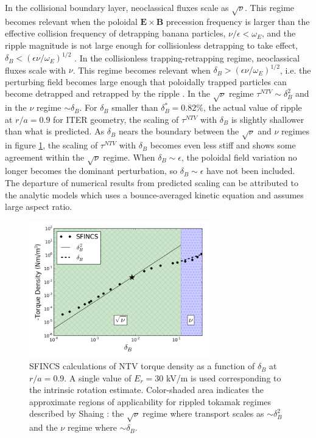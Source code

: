 \documentclass{article}
\numberwithin{figure}{section}
\numberwithin{equation}{section}
\begin{document}
In the collisional boundary layer, neoclassical fluxes scale as $\sqrt{\nu}$. This regime becomes relevant when the poloidal $\bm{E} \times \bm{B}$ precession frequency is larger than the effective collision frequency of detrapping banana particles, $\nu/\epsilon < \omega_E$, and the ripple magnitude is not large enough for collisionless detrapping to take effect, $\delta_B < \left(  \epsilon \nu/\omega_E \right)^{1/2}$ \cite{Shaing2008}. 
In the collisionless trapping-retrapping regime, neoclassical fluxes scale with $\nu$. This regime becomes relevant when $\delta_B > \left(  \epsilon \nu/\omega_E \right)^{1/2}$, i.e. the perturbing field becomes large enough that poloidally trapped particles can become detrapped and retrapped by the ripple \cite{Shaing2010}. In the $\sqrt{\nu}$ regime $\tau^{NTV} \sim \delta_B^2$ and in the $\nu$ regime $\sim \delta_B$. For $\delta_B$ smaller than $\delta_B^* = 0.82\%$, the actual value of ripple at $r/a=0.9$ for ITER geometry, the scaling of $\tau^{NTV}$ with $\delta_B$ is slightly shallower than what is predicted. 
As $\delta_B$ nears the boundary between the $\sqrt{\nu}$ and $\nu$ regimes in figure \ref{fig:scalescan}, the scaling of $\tau^{NTV}$ with $\delta_B$ becomes even less stiff and shows some agreement within the $\sqrt{\nu}$ regime. When $\delta_B \sim \epsilon$, the poloidal field variation no longer becomes the dominant perturbation, so $\delta_B \sim \epsilon$ have not been included. The departure of numerical results from predicted scaling can be attributed to the analytic models which uses a bounce-averaged kinetic equation and assumes large aspect ratio. 

\begin{figure}[h!]
\centering
\includegraphics[width=0.7\textwidth]
{scalescan.png}
\caption{\label{fig:scalescan} SFINCS calculations of NTV torque density as a function of $\delta_B$ at $r/a = 0.9$. A single value of $E_r = 30$ kV/m is used corresponding to the intrinsic rotation estimate. Color-shaded area indicates the approximate regions of applicability for rippled tokamak regimes described by Shaing \cite{Shaing2010, Shaing2008}: the $\sqrt{\nu}$ regime where transport scales as $\sim \delta_B^2$ and the $\nu$ regime where $\sim \delta_B$. }
\end{figure} 
\end{document}
